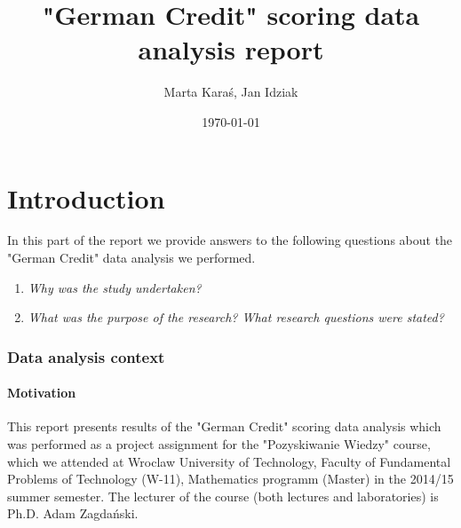 \documentclass[10pt]{article}\usepackage[]{graphicx}\usepackage[]{color}
\begin{document}
\title{"German Credit" scoring data analysis report}
\author{Marta Karaś, Jan Idziak}
\date{\today}
\maketitle


\newcommand{\E}{\mathbb{E}}
\newcommand{\Var}{\textnormal{Var}}
\newcommand{\bias}{\textnormal{bias}}
\newcommand{\mse}{\textnormal{MSE}}
\newcommand{\se}{\textnormal{se}}

\def\contentsname{Table of content}
\tableofcontents
\setcounter{tocdepth}{2}




\clearpage
\part{Introduction}

In this part of the report we provide answers to the following questions about the "German Credit" data analysis we performed. 
\begin{enumerate}
\item \textit{Why was the study undertaken?}
\item \textit{What was the purpose of the research? What research questions were stated?} 
\end{enumerate}



\section{Data analysis context}

\subsection{Motivation}
This report presents results of the "German Credit" scoring data analysis which was performed as a project assignment for the "Pozyskiwanie Wiedzy" course, which we attended at Wroclaw University of Technology, Faculty of Fundamental Problems of Technology (W-11), Mathematics programm (Master) in the 2014/15 summer semester. The lecturer of the course (both lectures and laboratories) is Ph.D. Adam Zagdański.
\end{document}
